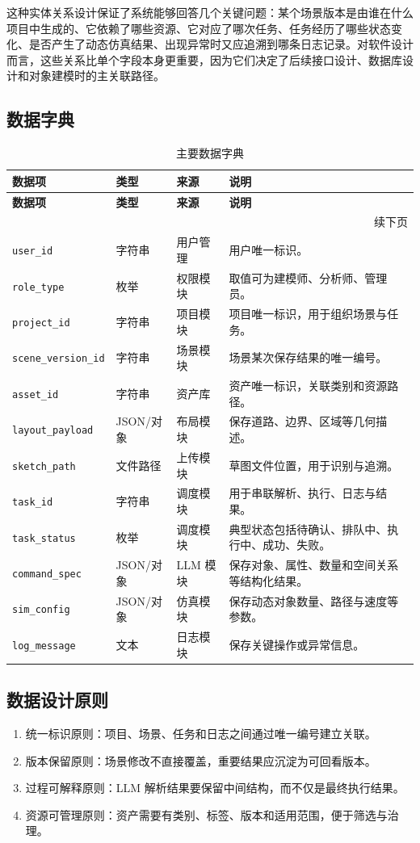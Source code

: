 这种实体关系设计保证了系统能够回答几个关键问题：某个场景版本是由谁在什么项目中生成的、它依赖了哪些资源、它对应了哪次任务、任务经历了哪些状态变化、是否产生了动态仿真结果、出现异常时又应追溯到哪条日志记录。对软件设计而言，这些关系比单个字段本身更重要，因为它们决定了后续接口设计、数据库设计和对象建模时的主关联路径。

\subsection{数据字典}
{
\renewcommand{\arraystretch}{1.3}
\begin{longtable}{p{2.5cm} p{1.8cm} p{2.0cm} p{6.0cm}}
\caption{主要数据字典}\label{tab:sdd_data_dict}\\
\toprule
\rowcolor{gray!20}
\textbf{数据项} & \textbf{类型} & \textbf{来源} & \textbf{说明} \\
\midrule
\endfirsthead
\toprule
\rowcolor{gray!20}
\textbf{数据项} & \textbf{类型} & \textbf{来源} & \textbf{说明} \\
\midrule
\endhead
\midrule
\multicolumn{4}{r}{\small 续下页}\\
\endfoot
\bottomrule
\endlastfoot
\texttt{user\_id} & 字符串 & 用户管理 & 用户唯一标识。 \\
\texttt{role\_type} & 枚举 & 权限模块 & 取值可为建模师、分析师、管理员。 \\
\texttt{project\_id} & 字符串 & 项目模块 & 项目唯一标识，用于组织场景与任务。 \\
\texttt{scene\_version\_id} & 字符串 & 场景模块 & 场景某次保存结果的唯一编号。 \\
\texttt{asset\_id} & 字符串 & 资产库 & 资产唯一标识，关联类别和资源路径。 \\
\texttt{layout\_payload} & JSON/对象 & 布局模块 & 保存道路、边界、区域等几何描述。 \\
\texttt{sketch\_path} & 文件路径 & 上传模块 & 草图文件位置，用于识别与追溯。 \\
\texttt{task\_id} & 字符串 & 调度模块 & 用于串联解析、执行、日志与结果。 \\
\texttt{task\_status} & 枚举 & 调度模块 & 典型状态包括待确认、排队中、执行中、成功、失败。 \\
\texttt{command\_spec} & JSON/对象 & LLM 模块 & 保存对象、属性、数量和空间关系等结构化结果。 \\
\texttt{sim\_config} & JSON/对象 & 仿真模块 & 保存动态对象数量、路径与速度等参数。 \\
\texttt{log\_message} & 文本 & 日志模块 & 保存关键操作或异常信息。 \\
\end{longtable}
}

\subsection{数据设计原则}
\begin{enumerate}[label=\arabic*.]
    \item 统一标识原则：项目、场景、任务和日志之间通过唯一编号建立关联。
    \item 版本保留原则：场景修改不直接覆盖，重要结果应沉淀为可回看版本。
    \item 过程可解释原则：LLM 解析结果要保留中间结构，而不仅是最终执行结果。
    \item 资源可管理原则：资产需要有类别、标签、版本和适用范围，便于筛选与治理。
\end{enumerate}
